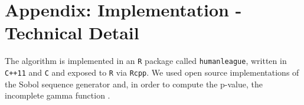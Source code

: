 \documentclass{JASSS}
\begin{document}






\endparano




\section{Appendix: Implementation - Technical Detail} 
The algorithm is implemented in an \texttt{R} package called
\texttt{humanleague}, written in \texttt{C++11} and \texttt{C} and
exposed to \texttt{R} via \texttt{Rcpp}. We used open source
implementations of the Sobol sequence generator \citep{johnson_stevengj/nlopt:_nodate} and, in order to 
compute the p-value, the
incomplete gamma function \citep{burkardt_asa032_2008}.
\end{document}
